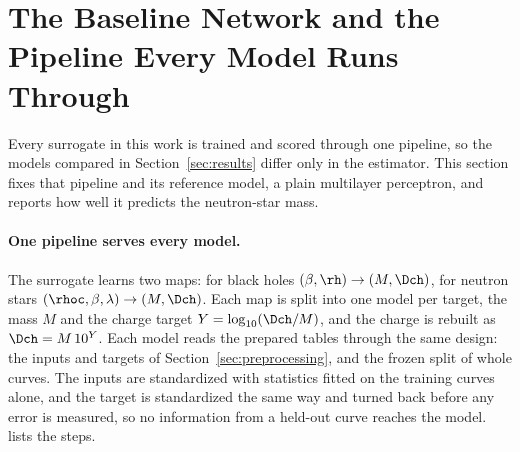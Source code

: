 \section{The Baseline Network and the Pipeline Every Model Runs Through}
\label{sec:algorithms}

\providecommand{\baseNsMassMare}{\placeholder{run make baseline}}
\providecommand{\baseNsMassRmse}{\placeholder{run make baseline}}
\providecommand{\baseNsMassFitSeconds}{\placeholder{run make baseline}}
\providecommand{\baseNsMassEpochs}{\placeholder{run make baseline}}
\providecommand{\baseNsChargeMareTrueM}{\placeholder{run make baseline}}
\providecommand{\baseNsChargeMarePredM}{\placeholder{run make baseline}}
\providecommand{\baseBhChargeMareTrueM}{\placeholder{run make baseline}}
\providecommand{\baseBhChargeMarePredM}{\placeholder{run make baseline}}

Every surrogate in this work is trained and scored through one pipeline, so the models compared in Section~\ref{sec:results} differ only in the estimator. This section fixes that pipeline and its reference model, a plain multilayer perceptron, and reports how well it predicts the neutron-star mass.

\paragraph{One pipeline serves every model.}
The surrogate learns two maps: for black holes $(\beta, \rh) \to (M, \Dch)$, for neutron stars $(\rhoc, \beta, \lambda) \to (M, \Dch)$. Each map is split into one model per target, the mass $M$ and the charge target $Y = \log_{10}(\Dch/M)$, and the charge is rebuilt as $\Dch = M\,10^{Y}$. Each model reads the prepared tables through the same design: the inputs and targets of Section~\ref{sec:preprocessing}, and the frozen split of whole curves. The inputs are standardized with statistics fitted on the training curves alone, and the target is standardized the same way and turned back before any error is measured, so no information from a held-out curve reaches the model.  lists the steps.

